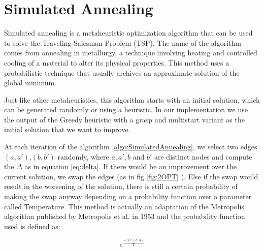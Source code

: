 


\section{Simulated Annealing}

Simulated annealing is a metaheuristic optimization algorithm that can be used to solve the Traveling Salesman Problem (TSP).
The name of the algorithm comes from annealing in metallurgy, a technique involving heating and controlled cooling of a material to alter its physical properties. This method uses a probabilistic technique that usually archives an approximate solution of the global minimum.

Just like other metaheuristics, this algorithm starts with an initial solution, which can be generated randomly or using a heuristic. In our implementation we use the output of the Greedy heuristic with a grasp and multistart variant as the initial solution that we want to improve.

At each iteration of the algorithm \ref*{algo:SimulatedAnnealing}, we select two edges $(a,a')$,$(b,b')$ randomly, where $a,a',b$ and $b'$ are distinct nodes and compute the $\Delta$ as in equation \ref{eq:delta}. If there would be an improvement over the current solution, we swap the edges (as in fig.\ref{fig:2OPT} ). Else if the swap would result in the worsening of the solution, there is still a certain probability of making the swap anyway depending on a probability function over a parameter called Temperature. This method is actually an adaptation of the Metropolis algorithm published by Metropolis et al. in 1953 and the probability function used is defined as:



\begin{equation*}
    e^{\frac{-\Delta \operatorname{c}(a,b)}{T}}
\end{equation*}

